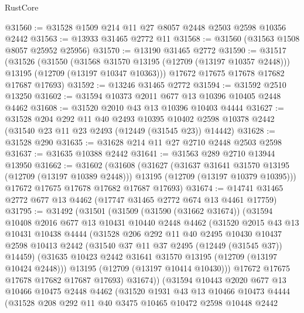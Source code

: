 \begin{lexlean}{RustCore}
\begin{coremodule}
@31560 := @31528 @1509 @214 @11 @27 @8057 @2448 @2503 @2598 @10356 @2442
@31563 := @13933 @31465 @2772 @11
@31568 := @31560 (@31563 @1508 @8057 @25952 @25956)
@31570 := @13190 @31465 @2772
@31590 := @31517
    (@31526
      (@31550
        (@31568 @31570 @13195 (@12709 (@13197 @10357 @2448)))
        @13195
        (@12709 (@13197 @10347 @10363)))
      @17672
      @17675
      @17678
      @17682
      @17687
      @17693)
@31592 := @13246 @31465 @2772
@31594 := @31592 @2510 @13250
@31602 := @31594 @10373 @2011 @677 @13 @10396 @10405 @2448 @4462
@31608 := @31520 @2010 @43 @13 @10396 @10403 @4444
@31627 := @31528
    @204
    @292
    @11
    @40
    @2493
    @10395
    @10402
    @2598
    @10378
    @2442
    (@31540 @23 @11 @23 @2493 (@12449 (@31545 @23)) @14442)
@31628 := @31528 @290
@31635 := @31628 @214 @11 @27 @2710 @2448 @2503 @2598
@31637 := @31635 @10388 @2442
@31641 := @31563 @289 @2710 @13944 @13950
@31662 := @31602
    (@31608
      (@31627
        (@31637 @31641 @31570 @13195 (@12709 (@13197 @10389 @2448)))
        @13195
        (@12709 (@13197 @10379 @10395)))
      @17672
      @17675
      @17678
      @17682
      @17687
      @17693)
@31674 := @14741 @31465 @2772 @677 @13 @4462 (@17747 @31465 @2772 @674 @13 @4461 @17759)
@31795 := @31492
    (@31501
      (@31509
        (@31590 (@31662 @31674))
        (@31594
          @10408
          @2016
          @677
          @13
          @10431
          @10440
          @2448
          @4462
          (@31520
            @2015
            @43
            @13
            @10431
            @10438
            @4444
            (@31528
              @206
              @292
              @11
              @40
              @2495
              @10430
              @10437
              @2598
              @10413
              @2442
              (@31540 @37 @11 @37 @2495 (@12449 (@31545 @37)) @14459)
              (@31635 @10423 @2442 @31641 @31570 @13195 (@12709 (@13197 @10424 @2448)))
              @13195
              (@12709 (@13197 @10414 @10430)))
            @17672
            @17675
            @17678
            @17682
            @17687
            @17693)
          @31674))
      (@31594
        @10443
        @2020
        @677
        @13
        @10466
        @10475
        @2448
        @4462
        (@31520
          @1931
          @43
          @13
          @10466
          @10473
          @4444
          (@31528
            @208
            @292
            @11
            @40
            @3475
            @10465
            @10472
            @2598
            @10448
            @2442

\end{coremodule}
\end{lexlean}
